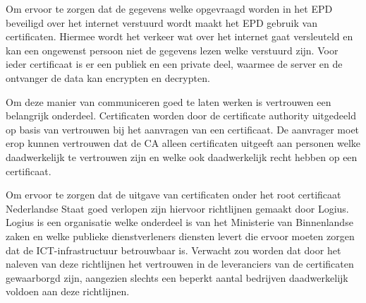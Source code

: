 Om ervoor te zorgen dat de gegevens welke opgevraagd worden in het EPD beveiligd over het internet verstuurd wordt maakt het EPD gebruik van certificaten. Hiermee wordt het verkeer wat over het internet gaat versleuteld en kan een ongewenst persoon niet de gegevens lezen welke verstuurd zijn. Voor ieder certificaat is er een publiek en een private deel, waarmee de server en de ontvanger de data kan encrypten en decrypten. 

Om deze manier van communiceren goed te laten werken is vertrouwen een belangrijk onderdeel. Certificaten worden door de certificate authority uitgedeeld op basis van vertrouwen bij het aanvragen van een certificaat. De aanvrager moet erop kunnen vertrouwen dat de CA alleen certificaten uitgeeft aan personen welke daadwerkelijk te vertrouwen zijn en welke ook daadwerkelijk recht hebben op een certificaat.

Om ervoor te zorgen dat de uitgave van certificaten onder het root certificaat Nederlandse Staat goed verlopen zijn hiervoor richtlijnen gemaakt door Logius\cite{bib.logius.pve}. Logius is een organisatie welke onderdeel is van het Ministerie van Binnenlandse zaken en welke publieke dienstverleners diensten levert die ervoor moeten zorgen dat de ICT-infrastructuur betrouwbaar is. Verwacht zou worden dat door het naleven van deze richtlijnen het vertrouwen in de leveranciers van de certificaten gewaarborgd zijn, aangezien slechts een beperkt aantal bedrijven daadwerkelijk voldoen aan deze richtlijnen. 

